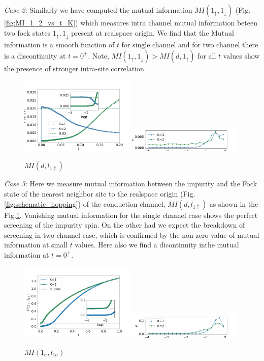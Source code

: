 \documentclass[reprint,prb,superscriptaddress]{revtex4-2}
\begin{document}
\par\textit{Case 2:} Similarly we have computed the mutual information $MI(1_{\uparrow},1_{\downarrow})$ (Fig.\ref{fig:MI_1_2_vs_t_K}) which measures intra channel  mutual information beteen two fock states $1_{\uparrow},1_{\downarrow}$ present at realspace origin. We find that the Mutual information is a smooth function of $t$ for single channel and for two channel there is a discontinuity at $t=0^{+}$. Note, $MI(1_{\uparrow},1_{\downarrow})>MI(d,1_{\uparrow})$ for all $t$ values show the presence of stronger intra-site correlation.

\begin{figure}
\includegraphics[width=0.49\textwidth]{plt/A_I2_ch12_['d','l1_up']}
\includegraphics[width=0.49\textwidth]{plt/errorbar_A_I2_ch12_['d','l1_up']}
\caption{$MI(d,l_{1\uparrow})$}
\label{fig:MI_d_l1}
\end{figure}
\par \textit{Case 3:} Here we measure mutual information between the impurity and the Fock state of the nearest neighbor site to the realspace origin (Fig.\ref{fig:schematic_hopping}) of the conduction channel, $MI(d,l_{1\uparrow})$ as shown in the Fig.\ref{fig:MI_d_l1}. Vanishing mutual information for the single channel case shows the perfect screening of the impurity spin. On the other had we expect the breakdown of screening in two channel case, which is confirmed by the non-zero value of mutual information at small $t$ values. Here also we find a dicontinuity inthe mutual information at $t=0^+$.


\begin{figure}[!htpb]
\includegraphics[width=0.49\textwidth]{plt/A_I2_ch12_['1','l1']}
\includegraphics[width=0.49\textwidth]{plt/errorbar_A_I2_ch12_['1','l1']}
\caption{$MI(1_{\sigma},l_{1\sigma})$}
\label{fig:MI_l_l1}
\end{figure}
\end{document}
